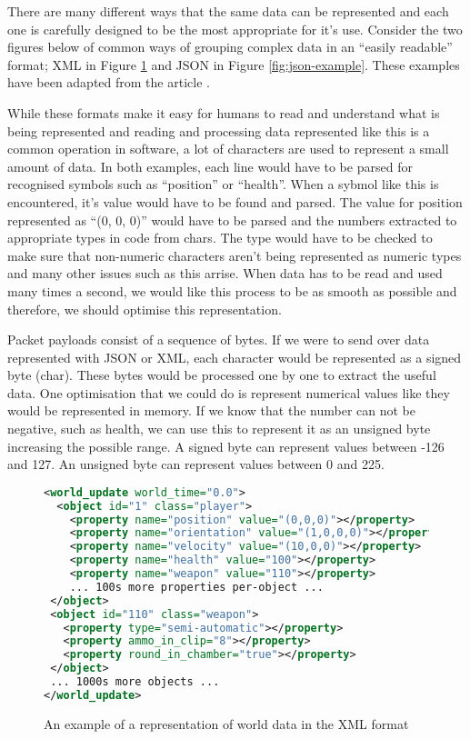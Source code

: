 There are many different ways that the same data can be represented and each one is carefully designed to be the most appropriate for it's use. Consider the two figures below of common ways of grouping complex data in an ``easily readable'' format; XML in Figure \ref{fig:xml-example} and JSON in Figure \ref{fig:json-example}. These examples have been adapted from the article .


While these formats make it easy for humans to read and understand what is being represented and reading and processing data represented like this is a common operation in software, a lot of characters are used to represent a small amount of data. In both examples, each line would have to be parsed for recognised symbols such as ``position'' or ``health''. When a sybmol like this is encountered, it's value would have to be found and parsed. The value for position represented as ``(0, 0, 0)'' would have to be parsed and the numbers extracted to appropriate types in code from chars. The type would have to be checked to make sure that non-numeric characters aren't being represented as numeric types and many other issues such as this arrise. When data has to be read and used many times a second, we would like this process to be as smooth as possible and therefore, we should optimise this representation.


Packet payloads consist of a sequence of bytes. If we were to send over data represented with JSON or XML, each character would be represented as a signed byte (char). These bytes would be processed one by one to extract the useful data. One optimisation that we could do is represent numerical values like they would be represented in memory. If we know that the number can not be negative, such as health, we can use this to represent it as an unsigned byte increasing the possible range. A signed byte can represent values between -126 and 127. An unsigned byte can represent values between 0 and 225.


\newpage
\begin{figure}[!ht]
\begin{lstlisting}[language=xml]
<world_update world_time="0.0">
  <object id="1" class="player">
    <property name="position" value="(0,0,0)"></property>
    <property name="orientation" value="(1,0,0,0)"></property>
    <property name="velocity" value="(10,0,0)"></property>
    <property name="health" value="100"></property>
    <property name="weapon" value="110"></property>
    ... 100s more properties per-object ...
 </object>
 <object id="110" class="weapon">
   <property type="semi-automatic"></property>
   <property ammo_in_clip="8"></property>
   <property round_in_chamber="true"></property>
 </object>
 ... 1000s more objects ...
</world_update>
\end{lstlisting}

\caption{An example of a representation of world data in the XML format}
\label{fig:xml-example}
\end{figure}

